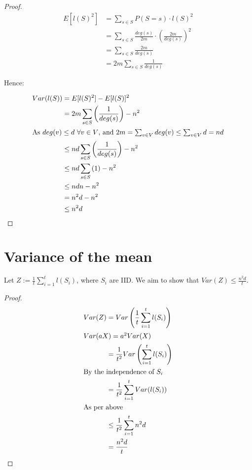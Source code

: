 \documentclass[a4paper]{scrreprt}
\begin{document}
\begin{proof}
  \begin{align*}
    E[l(S)^2] & = \sum_{s \in S}{P(S = s) \cdot l(S)^2} \\
    & = \sum_{s \in S}{\frac{deg(s)}{2m} \cdot \left(\frac{2m}{deg(s)}\right)^2} \\
    & = \sum_{s \in S}{\frac{2m}{deg(s)}} \\
    & = 2m \sum_{s \in S}{\frac{1}{deg(s)}}
  \end{align*}

  Hence:

  \begin{align*}
    Var(l(S)) & = E[l(S)^2] - E[l(S)]^2 \\
              & = 2m \sum_{s \in S}{\left(\frac{1}{deg(s)}\right)} - n^2 \\
    \intertext{As $deg(v) \leq d\ \forall v \in V$, and $2m = \sum_{v \in V}{deg(v)} \leq \sum_{v \in V}{d} = nd$}
    & \leq nd \sum_{s \in S}{\left(\frac{1}{deg(s)}\right)} - n^2 \\
    & \leq nd \sum_{s \in S}{\left(1\right)} - n^2 \\
    & \leq ndn - n^2 \\
    & = n^2d - n^2 \\
    & \leq n^2d
  \end{align*}
\end{proof}

\section{Variance of the mean}

Let $Z := \frac{1}{t} \sum_{i=1}^t{l(S_i)}$, where $S_i$ are IID. We aim to
show that $Var(Z) \leq \frac{n^2 d}{t}$.

\begin{proof}
  \begin{align*}
    Var(Z) & = Var\left(\frac{1}{t} \sum_{i=1}^t{l(S_i)}\right) \\
    \intertext{$Var(aX) = a^2 Var(X)$}
    & = \frac{1}{t^2} Var\left(\sum_{i=1}^t{l(S_i)}\right) \\
    \intertext{By the independence of $S_i$}
    & = \frac{1}{t^2} \sum_{i=1}^t{Var(l(S_i))} \\
    \intertext{As per above}
    & \leq \frac{1}{t^2} \sum_{i=1}^t{n^2 d} \\
    & = \frac{n^2 d}{t}
  \end{align*}
\end{proof}
\end{document}
